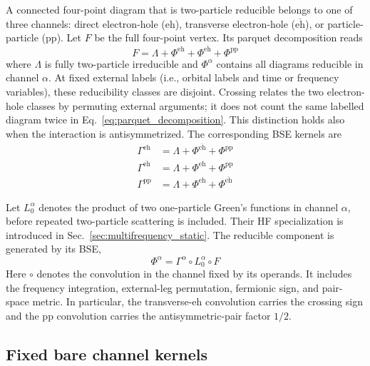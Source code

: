 \documentclass[aip,jcp,reprint,noshowkeys,superscriptaddress]{revtex4-1}
\newcommand{\eh}{\text{eh}}
\newcommand{\teh}{{\overline{\text{eh}}}}
\newcommand{\pp}{\text{pp}}
\begin{document}
A connected four-point diagram that is two-particle reducible belongs to one
of three channels: direct electron-hole ($\eh$), transverse electron-hole
($\teh$), or particle-particle ($\pp$). Let $F$ be the full four-point vertex. Its
parquet decomposition reads\cite{Marie2025}
\begin{equation}
    F
    =
    \Lambda
    +
    \Phi^{\eh}
    +
    \Phi^{\teh}
    +
    \Phi^{\pp}
    \label{eq:parquet_decomposition}
\end{equation}
where $\Lambda$ is fully two-particle irreducible and $\Phi^{\alpha}$ contains all
diagrams reducible in channel $\alpha$. At fixed external labels (i.e., orbital labels and time or frequency variables),
these reducibility classes are disjoint. Crossing relates the two
electron-hole classes by permuting external arguments; it does not count
the same labelled diagram twice in Eq.~\eqref{eq:parquet_decomposition}.
This distinction holds also when the interaction is
antisymmetrized.\cite{Marie2025} The corresponding BSE kernels are
\begin{align}
    \Gamma^{\eh}
    &=\Lambda+\Phi^{\teh}+\Phi^{\pp}
    \\
    \Gamma^{\teh}
    &=\Lambda+\Phi^{\eh}+\Phi^{\pp}
    \\
    \Gamma^{\pp}
    &=\Lambda+\Phi^{\eh}+\Phi^{\teh}
    \label{eq:parquet_kernels}
\end{align}

Let $L_0^{\alpha}$ denotes the product of two one-particle Green's functions in
channel $\alpha$, before repeated two-particle scattering is included. 
Their HF specialization is
introduced in Sec.~\ref{sec:multifrequency_static}. The reducible component
is generated by its BSE,
\begin{equation}
    \Phi^{\alpha}
    =
    \Gamma^{\alpha} \circ L_0^{\alpha} \circ F
    \label{eq:Phi_BSE_channel}
\end{equation}
Here $\circ$ denotes the convolution in the channel fixed by its operands.
It includes the frequency integration, external-leg permutation, fermionic
sign, and pair-space metric. In particular, the
transverse-$\eh$ convolution carries the crossing sign and the $\pp$
convolution carries the antisymmetric-pair factor $1/2$.

\subsection{Fixed bare channel kernels}
\label{sec:bare_kernel_stage}
\end{document}
